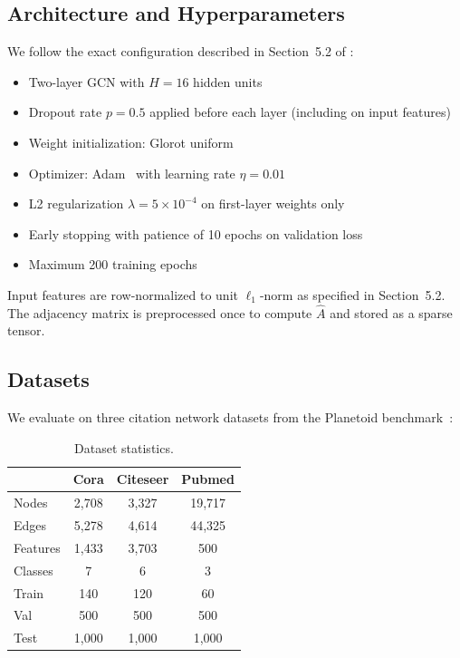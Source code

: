 \documentclass[10pt,twocolumn]{article}
\begin{document}
\subsection{Architecture and Hyperparameters}

We follow the exact configuration described in Section~5.2 of \citet{kipf2017semi}:

\begin{itemize}
    \item Two-layer GCN with $H = 16$ hidden units
    \item Dropout rate $p = 0.5$ applied before each layer (including on input features)
    \item Weight initialization: Glorot uniform~\citep{glorot2010understanding}
    \item Optimizer: Adam~\citep{kingma2015adam} with learning rate $\eta = 0.01$
    \item L2 regularization $\lambda = 5 \times 10^{-4}$ on first-layer weights only
    \item Early stopping with patience of 10 epochs on validation loss
    \item Maximum 200 training epochs
\end{itemize}

Input features are row-normalized to unit $\ell_1$-norm as specified in Section~5.2.
The adjacency matrix is preprocessed once to compute $\hat{A}$ and stored as a sparse tensor.

\subsection{Datasets}

We evaluate on three citation network datasets from the Planetoid benchmark~\citep{yang2016revisiting}:

\begin{table}[h]
\centering
\caption{Dataset statistics.}
\label{tab:datasets}
\small
\begin{tabular}{@{}lccc@{}}
\toprule
& \textbf{Cora} & \textbf{Citeseer} & \textbf{Pubmed} \\
\midrule
Nodes     & 2{,}708  & 3{,}327  & 19{,}717 \\
Edges     & 5{,}278  & 4{,}614  & 44{,}325 \\
Features  & 1{,}433  & 3{,}703  & 500 \\
Classes   & 7        & 6        & 3 \\
Train     & 140      & 120      & 60 \\
Val       & 500      & 500      & 500 \\
Test      & 1{,}000  & 1{,}000  & 1{,}000 \\
\bottomrule
\end{tabular}
\end{table}
\end{document}

